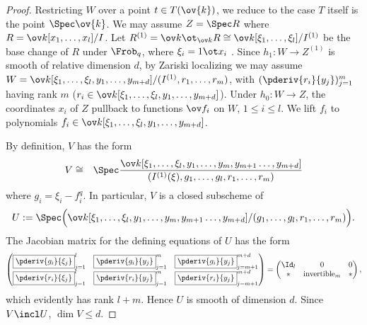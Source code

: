 \begin{proof} Restricting $W$ over a point $t\in T(\ov{k})$, we reduce to the case $T$ itself is the point $\Spec\ov{k}$. We may assume $Z=\Spec R$ where $R=\ov k[x_{1},\ldots, x_{l}]/I$. Let $R^{(1)}=\ov k\ot_{\ov k}R\cong \ov k[\xi_{1},\ldots, \xi_{l}]/I^{(1)}$ be the base change of $R$ under $\Frob_{q}$, where $\xi_{i}=1\ot x_{i}$ . Since $h_{1}: W\to Z^{(1)}$ is smooth of relative dimension $d$,  by Zariski localizing we may assume $W=\ov k[\xi_{1},\ldots, \xi_{l}, y_{1},\ldots, y_{m+d}]/(I^{(1)}, r_{1},\ldots, r_{m})$,  with $(\pderiv{r_i}{y_j})_{j=1}^m$ having rank $m$ ($r_{i}\in \ov k[\xi_{1},\ldots, \xi_{l}, y_{1},\ldots, y_{m+d}]$). Under $h_{0}: W\to Z$, the coordinates $x_{i}$ of $Z$ pullback to functions $\ov f_{i}$ on $W$, $1\le i\le l$. We lift $f_{i}$ to polynomials $f_{i}\in \ov k[\xi_{1},\ldots, \xi_{l}, y_{1},\ldots, y_{m+d}]$.

By definition, $V$ has the form
\begin{eqnarray*}
V & \cong&  \Spec\frac{ \ov k[\xi_{1},\ldots, \xi_{l}, y_1, \ldots, y_m, y_{m+1} \ldots, y_{m+d}  ]}
{(I^{(1)}(\xi), g_{1},\ldots, g_{l}, r_1, \ldots, r_m)}
\end{eqnarray*}
where $g_{i}=\xi_{i}-f_{i}^{q}$. In particular,  $V$ is a closed subscheme of
\begin{equation}
U:=\Spec\Big( \ov k[\xi_{1},\ldots, \xi_{l}, y_1, \ldots, y_m, y_{m+1} \ldots, y_{m+d}  ]/ (g_{1},\ldots, g_{l}, r_1, \ldots, r_m)\Big).
\end{equation}
The Jacobian matrix for the defining equations of $U$ has the form
\[
\begin{pmatrix}
\boxed{\pderiv{g_i}{\xi_j}}_{j=1}^l  & \boxed{\pderiv{g_i}{y_j}}_{j=1}^m & \boxed{\pderiv{g_i}{y_j}}_{j=m+1}^{m+d}  \\
\boxed{\pderiv{r_i}{\xi_j}}_{j=1}^l  & \boxed{\pderiv{r_i}{y_j}}_{j=1}^m & \boxed{\pderiv{r_i}{y_j}}_{j=m+1}^{m+d}
\end{pmatrix} = \begin{pmatrix} \Id_l & 0 &  0 \\ * & \text{invertible}_m & *  \end{pmatrix},
\]
which evidently has rank $l+m$. Hence $U$ is smooth of dimension $d$. Since $V\incl U$, $\dim V\le d$.
\end{proof}



